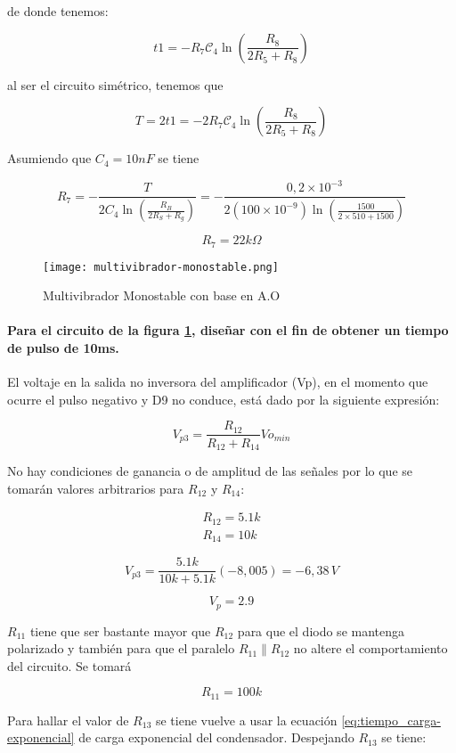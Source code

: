 de donde tenemos: 

\[
t1 = - R_7 \mathcal{C}_4 \ln \left( \frac{R_8}{2 R_5 + R_8} \right)
\]

al ser el circuito simétrico, tenemos que 

\[
T = 2 t1 = - 2R_7 \mathcal{C}_4 \ln \left( \frac{R_8}{2 R_5 + R_8} \right)
\]



Asumiendo que $C_4 = 10nF$ se tiene

\[
R_7 = - \frac{T}{2C_4 \ln \left( \frac{R_B}{2R_S + R_g} \right)} = - \frac{0,2 \times 10^{-3}}{2 (100 \times 10^{-9}) \ln \left( \frac{1500}{2 \times 510 + 1500} \right)}
\]

$$R_7 = 22k\Omega$$


\begin{figure}[ht]
    \centering
    \texttt{[image: multivibrador-monostable.png]}
    \caption{Multivibrador Monostable con base en A.O}
    \label{fig:multivibrador-monostable}
\end{figure}


\paragraph{Para el circuito de la figura \ref{fig:multivibrador-monostable}, diseñar con el fin de obtener un tiempo de pulso de 10ms. }

El voltaje en la salida no inversora del amplificador (Vp), en el momento que ocurre el pulso negativo y D9 no conduce, está dado por la siguiente expresión: 

\[
V_{p3} = \frac{R_{12}}{R_{12} + R_{14}} Vo_{min}
\]

No hay condiciones de ganancia o de amplitud de las señales por lo que se tomarán valores arbitrarios para $R_{12}$ y $R_{14}$:

\begin{align}
    R_{12} = 5.1k \\
    R_14 = 10k
\end{align}

\[
V_{p3} = \frac{5.1k}{10k + 5.1k} (-8,005) = -6,38\,V
\]

$$V_p = 2.9$$

$R_{11}$ tiene que ser bastante mayor que $R_{12}$ para que el diodo se mantenga polarizado y también para que el paralelo $R_11 \parallel R_12$ no altere el comportamiento del circuito. Se tomará 

$$R_{11} = 100k$$

Para hallar el valor de $R_{13}$ se tiene vuelve a usar la ecuación \ref{eq:tiempo_carga-exponencial} de carga exponencial del condensador. Despejando $R_{13}$ se tiene:

